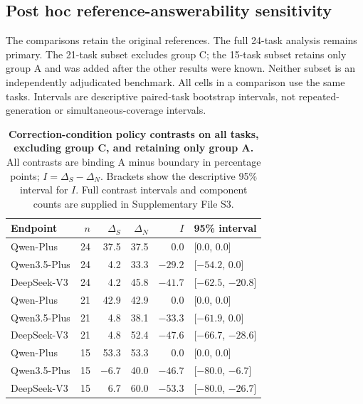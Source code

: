 \subsection*{Post hoc reference-answerability sensitivity}
The comparisons retain the original references. The full 24-task analysis remains primary. The 21-task subset excludes group C; the 15-task subset retains only group A and was added after the other results were known. Neither subset is an independently adjudicated benchmark. All cells in a comparison use the same tasks. Intervals are descriptive paired-task bootstrap intervals, not repeated-generation or simultaneous-coverage intervals.

\begin{table}[H]
\centering\small
\caption{\textbf{Correction-condition policy contrasts on all tasks, excluding group C, and retaining only group A.} All contrasts are binding A minus boundary in percentage points; $I=\Delta_S-\Delta_N$. Brackets show the descriptive 95\% interval for $I$. Full contrast intervals and component counts are supplied in Supplementary File S3.}
\label{tab:reference-sensitivity}
\begin{tabular}{lrrrrl}
\toprule Endpoint & $n$ & $\Delta_S$ & $\Delta_N$ & $I$ & 95\% interval\\\midrule
Qwen-Plus & 24 & 37.5 & 37.5 & 0.0 & [0.0, 0.0]\\
Qwen3.5-Plus & 24 & 4.2 & 33.3 & $-29.2$ & [$-54.2$, 0.0]\\
DeepSeek-V3 & 24 & 4.2 & 45.8 & $-41.7$ & [$-62.5$, $-20.8$]\\
\midrule
Qwen-Plus & 21 & 42.9 & 42.9 & 0.0 & [0.0, 0.0]\\
Qwen3.5-Plus & 21 & 4.8 & 38.1 & $-33.3$ & [$-61.9$, 0.0]\\
DeepSeek-V3 & 21 & 4.8 & 52.4 & $-47.6$ & [$-66.7$, $-28.6$]\\
\midrule
Qwen-Plus & 15 & 53.3 & 53.3 & 0.0 & [0.0, 0.0]\\
Qwen3.5-Plus & 15 & $-6.7$ & 40.0 & $-46.7$ & [$-80.0$, $-6.7$]\\
DeepSeek-V3 & 15 & 6.7 & 60.0 & $-53.3$ & [$-80.0$, $-26.7$]\\
\bottomrule
\end{tabular}
\end{table}
\FloatBarrier
